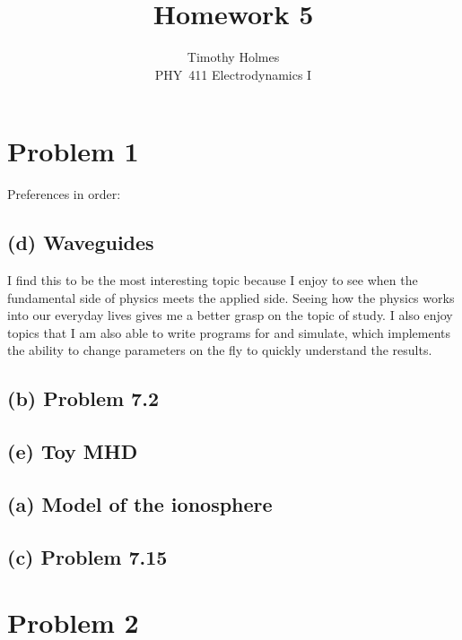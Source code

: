 \documentclass[11pt]{article}
\newcommand{\HWnum}{5}
\newcommand{\Subject}{PHY}
\begin{document}

\title{Homework {\HWnum}}
\author{Timothy Holmes \\ \Subject~411 Electrodynamics I}

\maketitle

\section*{Problem 1}

Preferences in order:

\subsection*{(d) Waveguides}

I find this to be the most interesting topic because I enjoy to see when the fundamental side of physics meets the applied side. Seeing how the physics works into our everyday lives gives me a better grasp on the topic of study. I also enjoy topics that I am also able to write programs for and simulate, which implements the ability to change parameters on the fly to quickly understand the results. 

\subsection*{(b) Problem 7.2}

\subsection*{(e) Toy MHD}

\subsection*{(a) Model of the ionosphere}

\subsection*{(c) Problem 7.15}

\clearpage

\section*{Problem 2}
\end{document}

